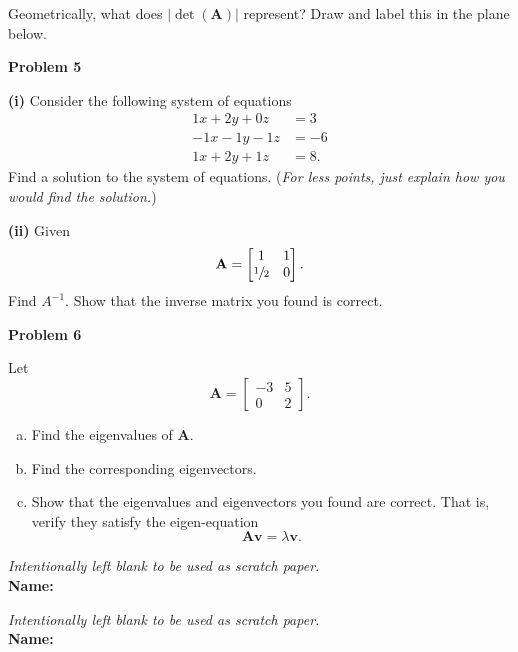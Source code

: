 \documentclass[12pt]{amsbook}
\begin{document}
Geometrically, what does $|\det(\mathbf{A})|$ represent? Draw and label this in the plane below.
    \begin{center}
    \end{center}












\newpage

\textbf{Problem 5}

\vspace{.25cm}

\noindent\textbf{(i)} Consider the following system of equations
\begin{align*}
    1x+2y+0z&=3\\
    -1x-1y-1z&=-6\\
    1x+2y+1z&=8.
\end{align*}
Find a solution to the system of equations. (\emph{For less points, just explain how you would find the solution.})

\vspace*{10cm}

\noindent\textbf{(ii)} Given
\[
\mathbf{A}=\begin{bmatrix} 1 & 1 \\ \sfrac{1}{2} & 0 \end{bmatrix}.
\]
Find $A^{-1}$.  Show that the inverse matrix you found is correct.













\newpage

\textbf{Problem 6} 

\vspace{.25cm}

Let
\[
\mathbf{A}=\begin{bmatrix} -3 & 5\\ 0 & 2\end{bmatrix}.
\]
\begin{enumerate}[(a)]
    \item Find the eigenvalues of $\mathbf{A}$.
    \item Find the corresponding eigenvectors.
    \item Show that the eigenvalues and eigenvectors you found are correct.  That is, verify they satisfy the eigen-equation
    \[
    \mathbf{A}\mathbf{v}=\lambda \mathbf{v}.
    \]
\end{enumerate}



\newpage
\emph{Intentionally left blank to be used as scratch paper.}\\

\textbf{Name:} \underline{\hspace*{8cm}}

\newpage
\emph{Intentionally left blank to be used as scratch paper.}\\

\textbf{Name:} \underline{\hspace*{8cm}}
\end{document}
